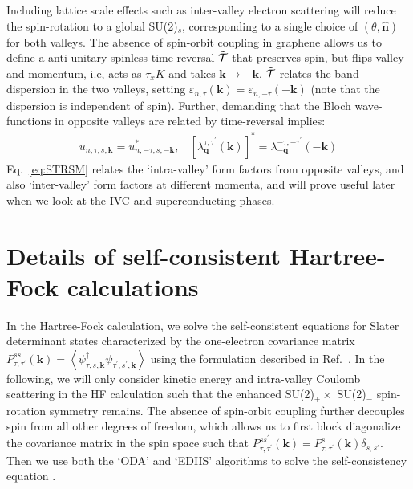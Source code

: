 \documentclass[aps,pra,twocolumn,superscriptaddress,10pt,article,nofootinbib,showpacs,longbibliography]{revtex4-1}
\def \k{{\mathbf k}}
\def \n{{\mathbf n}}
\def \q{{\mathbf q}}
\def \beq{\begin{eqnarray}}
\def \eeq{\end{eqnarray}}
\begin{document}
Including lattice scale effects such as inter-valley electron scattering will reduce the spin-rotation to a global SU(2)$_s$, corresponding to a single choice of $(\theta, \hat{\n})$ for both valleys. 
The absence of spin-orbit coupling in graphene allows us to define a anti-unitary spinless time-reversal $\tilde{\cal{T}}$ that preserves spin, but flips valley and momentum, i.e, acts as $\tau_x K$ and takes $\k \to -\k$. 
$\tilde{\cal{T}}$ relates the band-dispersion in the two valleys, setting $\varepsilon_{n,\tau}(\k) = \varepsilon_{n,-\tau}(-\k)$ (note that the dispersion is independent of spin).
Further, demanding that the Bloch wave-functions in opposite valleys are related by time-reversal implies:
\beq 
u_{n,\tau,s,\k} = u^*_{n,-\tau,s,-\k}, ~~~~  [\lambda^{\tau, \tau^\prime}_\q(\k)]^* = \lambda^{-\tau, -\tau^\prime}_{-\q}(-\k) 
\label{eq:STRSM}
\eeq
Eq.~\eqref{eq:STRSM} relates the `intra-valley' form factors from opposite valleys, and also `inter-valley' form factors at different momenta, and will prove useful later when we look at the IVC and superconducting phases.

\section{Details of self-consistent Hartree-Fock calculations}

In the Hartree-Fock calculation, we solve the self-consistent equations for Slater determinant states characterized by the one-electron covariance matrix $P_{\tau, \tau^{\prime}}^{s s^{\prime}}(\mathbf{k})=\left\langle\psi_{\tau, s, \mathbf{k}}^{\dagger} \psi_{\tau^{\prime}, s^{\prime}, \mathbf{k}}\right\rangle$ using the formulation described in Ref.~. In the following, we will only consider kinetic energy and intra-valley Coulomb scattering in the HF calculation such that the enhanced SU(2)$_+ \times$ SU(2)$_-$ spin-rotation symmetry remains. The absence of spin-orbit coupling further decouples spin from all other degrees of freedom, which allows us to first block diagonalize the covariance matrix in the spin space such that $P_{\tau, \tau^{\prime}}^{s s^{\prime}}(\mathbf{k}) = P_{\tau, \tau^{\prime}}^{s}(\mathbf{k}) \delta_{s,s'}$. 
Then we use both the `ODA' and `EDIIS' algorithms to solve the self-consistency equation \cite{ODA,EDIIS}.
\end{document}
